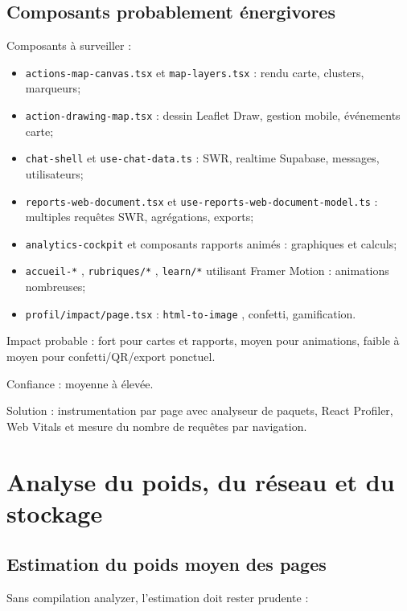 \documentclass[
  10pt,
  a4paper,
  DIV=11,
  numbers=noendperiod,
  oneside]{scrreprt}
\begin{document}
\subsection{Composants probablement
énergivores}\label{composants-probablement-uxe9nergivores}

Composants à surveiller :

\begin{itemize}
\item
  \texttt{actions-map-canvas.tsx} et \texttt{map-layers.tsx} : rendu
  carte, clusters, marqueurs;
\item
  \texttt{action-drawing-map.tsx} : dessin Leaflet Draw, gestion mobile,
  événements carte;
\item
  \texttt{chat-shell} et \texttt{use-chat-data.ts} : SWR, realtime
  Supabase, messages, utilisateurs;
\item
  \texttt{reports-web-document.tsx} et
  \texttt{use-reports-web-document-model.ts} : multiples requêtes SWR,
  agrégations, exports;
\item
  \texttt{analytics-cockpit} et composants rapports animés : graphiques
  et calculs;
\item
  \texttt{accueil-*} , \texttt{rubriques/*} , \texttt{learn/*} utilisant
  Framer Motion : animations nombreuses;
\item
  \texttt{profil/impact/page.tsx} : \texttt{html-to-image} , confetti,
  gamification.
\end{itemize}

Impact probable : fort pour cartes et rapports, moyen pour animations,
faible à moyen pour confetti/QR/export ponctuel.

Confiance : moyenne à élevée.

Solution : instrumentation par page avec analyseur de paquets, React
Profiler, Web Vitals et mesure du nombre de requêtes par navigation.

\section{Analyse du poids, du réseau et du
stockage}\label{analyse-du-poids-du-ruxe9seau-et-du-stockage}

\subsection{Estimation du poids moyen des
pages}\label{estimation-du-poids-moyen-des-pages}

Sans compilation analyzer, l'estimation doit rester prudente :
\end{document}
